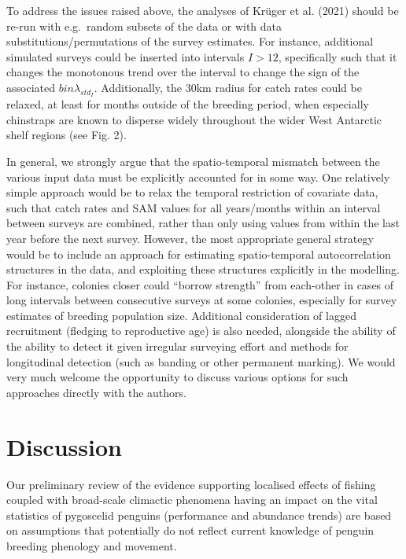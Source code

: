 \documentclass[]{elsarticle} %
\begin{document}
To address the issues raised above, the analyses of Krüger et al. (2021)
should be re-run with e.g.~random subsets of the data or with data
substitutions/permutations of the survey estimates. For instance,
additional simulated surveys could be inserted into intervals \(I>12\),
specifically such that it changes the monotonous trend over the interval
to change the sign of the associated \(bin\lambda_{std_I}\).
Additionally, the 30km radius for catch rates could be relaxed, at least
for months outside of the breeding period, when especially chinstraps
are known to disperse widely throughout the wider West Antarctic shelf
regions (see Fig. 2).

In general, we strongly argue that the spatio-temporal mismatch between
the various input data must be explicitly accounted for in some way. One
relatively simple approach would be to relax the temporal restriction of
covariate data, such that catch rates and SAM values for all
years/months within an interval between surveys are combined, rather
than only using values from within the last year before the next survey.
However, the most appropriate general strategy would be to include an
approach for estimating spatio-temporal autocorrelation structures in
the data, and exploiting these structures explicitly in the modelling.
For instance, colonies closer could ``borrow strength'' from each-other
in cases of long intervals between consecutive surveys at some colonies,
especially for survey estimates of breeding population size. Additional
consideration of lagged recruitment (fledging to reproductive age) is
also needed, alongside the ability of the ability to detect it given
irregular surveying effort and methods for longitudinal detection (such
as banding or other permanent marking). We would very much welcome the
opportunity to discuss various options for such approaches directly with
the authors.

\hypertarget{discussion}{%
\section{Discussion}\label{discussion}}

Our preliminary review of the evidence supporting localised effects of
fishing coupled with broad-scale climactic phenomena having an impact on
the vital statistics of pygoscelid penguins (performance and abundance
trends) are based on assumptions that potentially do not reflect current
knowledge of penguin breeding phenology and movement.
\end{document}
